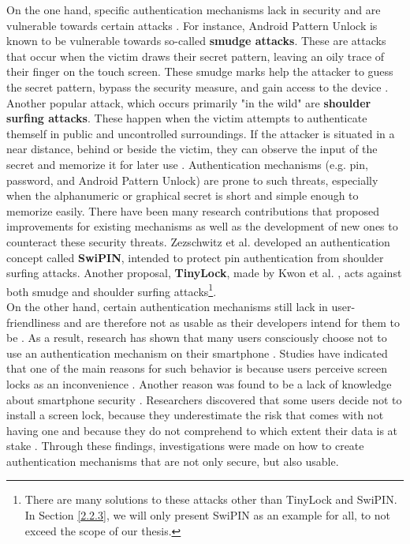 On the one hand, specific authentication mechanisms lack in security and are vulnerable towards certain attacks \cite{Schloeglhofer}. For instance, Android Pattern Unlock is known to be vulnerable towards so-called \textbf{smudge attacks}. These are attacks that occur when the victim draws their secret pattern, leaving an oily trace of their finger on the touch screen. These smudge marks help the attacker to guess the secret pattern, bypass the security measure, and gain access to the device \cite{ediss20251}. Another popular attack, which occurs primarily "in the wild" are \textbf{shoulder surfing attacks}. These happen when the victim attempts to authenticate themself in public and uncontrolled surroundings. If the attacker is situated in a near distance, behind or beside the victim, they can observe the input of the secret and memorize it for later use \cite{ediss20251}. Authentication mechanisms (e.g. pin, password, and Android Pattern Unlock) are prone to such threats, especially when the alphanumeric or graphical secret is short and simple enough to memorize easily. There have been many research contributions that proposed improvements for existing mechanisms as well as the development of new ones to counteract these security threats. Zezschwitz et al. \cite{vonZezschwitz:2015:SFS:2702123.2702212} developed an authentication concept called \textbf{SwiPIN}, intended to protect pin authentication from shoulder surfing attacks. Another proposal, \textbf{TinyLock}, made by Kwon et al. \cite{kwon}, acts against both smudge and shoulder surfing attacks\footnote{There are many solutions to these attacks other than TinyLock and SwiPIN. In Section \ref{2.2.3}, we will only present SwiPIN as an example for all, to not exceed the scope of our thesis.}.\\

On the other hand, certain authentication mechanisms still lack in user-friendliness and are therefore not as usable as their developers intend for them to be \cite{Schloeglhofer}. As a result, research has shown that many users consciously choose not to use an authentication mechanism on their smartphone \cite{ediss20251, Albayram:2017:BUL:3235924.3235929, Egelman:2014:YRL:2660267.2660273}. Studies have indicated that one of the main reasons for such behavior is because users perceive screen locks as an inconvenience \cite{Albayram:2017:BUL:3235924.3235929, ediss20251, harbach}. Another reason was found to be a lack of knowledge about smartphone security \cite{Albayram:2017:BUL:3235924.3235929, Adams:1999:UE:322796.322806}. Researchers discovered that some users decide not to install a screen lock, because they underestimate the risk that comes with not having one and because they do not comprehend to which extent their data is at stake \cite{Egelman:2014:YRL:2660267.2660273}. Through these findings, investigations were made on how to create authentication mechanisms that are not only secure, but also usable.

